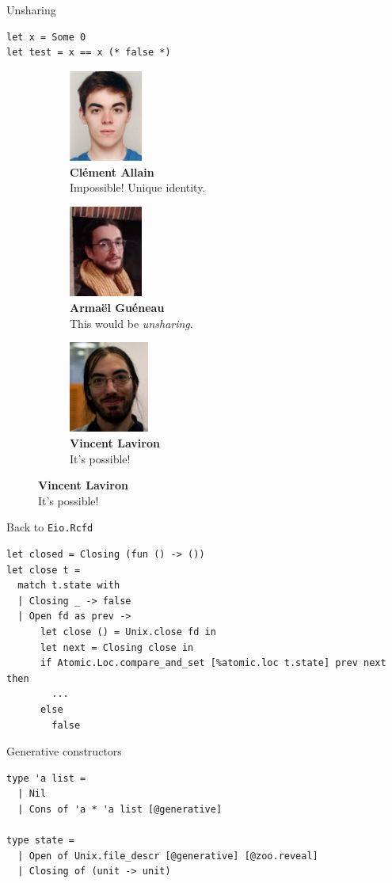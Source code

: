 \begin{frame}[fragile]{Unsharing}
\Large
\begin{verbatim}
let x = Some 0
let test = x == x (* false *)
\end{verbatim}
\vfill
\begin{figure}
  \captionsetup{justification=centering}
  \begin{subfigure}[b]{0.3\textwidth}
    \centering
    \includegraphics[height=3cm]{images/clement_allain.jpg}
    \caption*{\footnotesize \textbf{Clément Allain} \\ Impossible! Unique identity.}
  \end{subfigure}
  \begin{subfigure}[b]{0.3\textwidth}
    \centering
    \includegraphics[height=3cm]{images/armael_gueneau.jpg}
    \caption*{\footnotesize \textbf{Armaël Guéneau} \\ This would be \emph{unsharing}.}
  \end{subfigure}
  \begin{subfigure}[b]{0.3\textwidth}
    \centering
    \includegraphics[height=3cm]{images/vincent_laviron.jpg}
    \caption*{\footnotesize \textbf{Vincent Laviron} \\ It's possible!}
  \end{subfigure}
\end{figure}
\end{frame}

\begin{frame}[fragile]{Back to \texttt{Eio.Rcfd}}
\begin{verbatim}
let closed = Closing (fun () -> ())
let close t =
  match t.state with
  | Closing _ -> false
  | Open fd as prev ->
      let close () = Unix.close fd in
      let next = Closing close in
      if Atomic.Loc.compare_and_set [%atomic.loc t.state] prev next then
        ...
      else
        false
\end{verbatim}
\end{frame}

\begin{frame}[fragile]{Generative constructors}
\Large
\begin{verbatim}
type 'a list =
  | Nil
  | Cons of 'a * 'a list [@generative]

type state =
  | Open of Unix.file_descr [@generative] [@zoo.reveal]
  | Closing of (unit -> unit)
\end{verbatim}
\end{frame}
